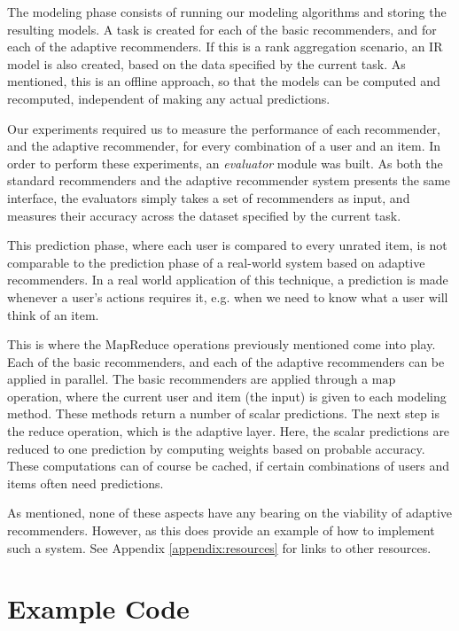 The modeling phase consists of running our modeling algorithms and storing the resulting models.
A task is created for each of the basic recommenders, and for each of the adaptive recommenders.
If this is a rank aggregation scenario, an IR model is also created, based on the data
specified by the current task.
As mentioned, this is an offline approach, so that the models can be computed and recomputed,
independent of making any actual predictions.

Our experiments required us to measure the performance of each
recommender, and the adaptive recommender, for every combination of 
a user and an item.
In order to perform these experiments, an \emph{evaluator} module was built.
As both the standard recommenders and the adaptive recommender system presents the same 
interface, the evaluators simply takes a set of recommenders as input, 
and measures their accuracy across the dataset specified by the current task.

This prediction phase, where each user is compared to every unrated item,
is not comparable to the prediction phase of a real-world system
based on adaptive recommenders. In a real world application of this technique,
a prediction is made whenever a user's actions requires it,
e.g. when we need to know what a user will think of an item.

This is where the $\mathrm{MapReduce}$ operations previously mentioned come into play.
Each of the basic recommenders, and each of the adaptive recommenders can be applied in parallel.
The basic recommenders are applied through a $\mathrm{map}$ operation, where the current user and item (the input)
is given to each modeling method. These methods return a number of scalar predictions.
The next step is the $\mathrm{reduce}$ operation, which is the adaptive layer.
Here, the scalar predictions are reduced to one prediction by computing weights
based on probable accuracy.
These computations can of course be cached, if certain combinations of users and items
often need predictions.

As mentioned, none of these aspects have any bearing on the viability of adaptive recommenders.
However, as this does provide an example of how to implement such a system. 
See Appendix \ref{appendix:resources} for links to other resources. 


\section{Example Code}

